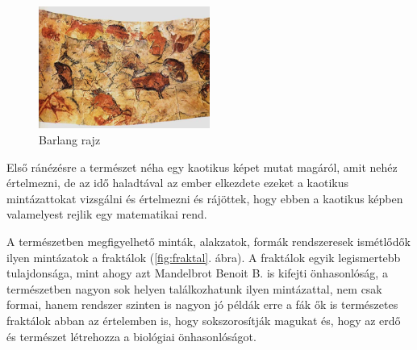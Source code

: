 \begin{figure}[h!]
	\centering
	\includegraphics[width=0.5\textwidth]{img/osi.jpg}
	\caption{Barlang rajz}
	\label{fig:osi}
\end{figure}

Első ránézésre a természet néha egy kaotikus képet mutat magáról, amit nehéz értelmezni, de az idő haladtával az ember elkezdete ezeket a kaotikus mintázattokat vizsgálni és értelmezni és rájöttek, hogy ebben a kaotikus képben valamelyest rejlik egy matematikai rend.

A természetben megfigyelhető minták, alakzatok, formák rendszeresek ismétlődők ilyen mintázatok a fraktálok (\ref{fig:fraktal}. ábra). A fraktálok egyik legismertebb tulajdonsága, mint ahogy azt Mandelbrot Benoit B. is kifejti \cite{mandelbrot1982fractal} önhasonlóság, a természetben nagyon sok helyen találkozhatunk ilyen mintázattal, nem csak formai, hanem rendszer szinten is nagyon jó példák erre a fák ők is természetes fraktálok abban az értelemben is, hogy sokszorosítják magukat és, hogy az erdő és természet létrehozza a biológiai önhasonlóságot. 

